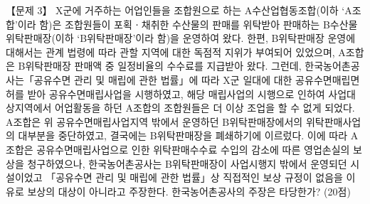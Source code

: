 \begin{longquestion}{【문제 3】}
X군에 거주하는 어업인들을 조합원으로 하는 A수산업협동조합(이하 ‘A조합’이라 함)은 조합원들이 포획ㆍ채취한 수산물의 판매를 위탁받아 판매하는 B수산물위탁판매장(이하 ‘B위탁판매장’이라 함)을 운영하여 왔다. 한편, B위탁판매장 운영에 대해서는 관계 법령에 따라 관할 지역에 대한 독점적 지위가 부여되어 있었으며, A조합은 B위탁판매장 판매액 중 일정비율의 수수료를 지급받아 왔다. 그런데, 한국농어촌공사는「공유수면 관리 및 매립에 관한 법률」에 따라 X군 일대에 대한 공유수면매립면허를 받아 공유수면매립사업을 시행하였고, 해당 매립사업의 시행으로 인하여 사업대상지역에서 어업활동을 하던 A조합의 조합원들은 더 이상 조업을 할 수 없게 되었다. A조합은 위 공유수면매립사업지역 밖에서 운영하던 B위탁판매장에서의 위탁판매사업의 대부분을 중단하였고, 결국에는 B위탁판매장을 폐쇄하기에 이르렀다. 이에 따라 A조합은 공유수면매립사업으로 인한 위탁판매수수료 수입의 감소에 따른 영업손실의 보상을 청구하였으나, 한국농어촌공사는 B위탁판매장이 사업시행지 밖에서 운영되던 시설이었고 「공유수면 관리 및 매립에 관한 법률」상 직접적인 보상 규정이 없음을 이유로 보상의 대상이 아니라고 주장한다. 한국농어촌공사의 주장은 타당한가? (20점) \par
\end{longquestion}
